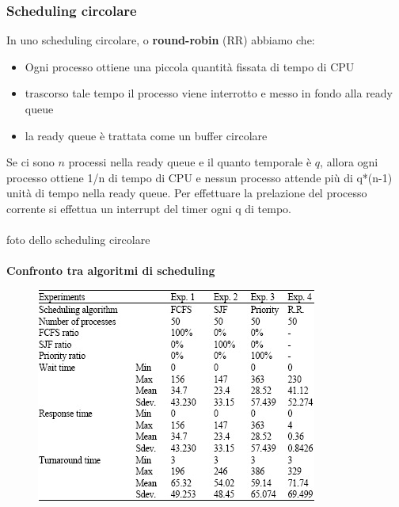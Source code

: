 \documentclass[11pt]{article}
\begin{document}
\subsubsection{Scheduling circolare}
In uno scheduling circolare, o \textbf{round-robin} (RR) abbiamo che:
\begin{itemize}
	\item Ogni processo ottiene una piccola quantità fissata di tempo di CPU
	\item trascorso tale tempo il processo viene interrotto e messo in fondo alla ready queue
	\item la ready queue è trattata come un buffer circolare
\end{itemize}
Se ci sono $n$ processi nella ready queue e il quanto temporale è $q$, allora ogni processo ottiene 1/n di tempo di CPU e nessun processo attende più di q*(n-1) unità di tempo nella ready queue.
Per effettuare la prelazione del processo corrente si effettua un interrupt del timer ogni q di tempo.
\\ \\
foto dello scheduling circolare
\\ \\


\textbf{Confronto tra algoritmi di scheduling}
\begin{figure}[H]
\includegraphics[scale=8]{scheduling-vs.jpg}
\centering
\end{figure}
\end{document}
